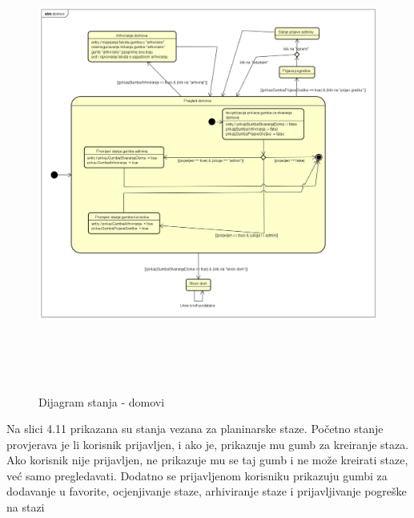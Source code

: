 			\begin{figure}[H]
				\includegraphics[width=160mm,height=150mm]{dijagrami/sd-autentikacija/domovi.png} %
				\centering
				\caption{Dijagram stanja - domovi}
				\label{fig:dijagrami_stanja2}
			\end{figure}
		
		    Na slici 4.11 prikazana su stanja vezana za planinarske staze. Početno stanje provjerava je li korisnik prijavljen, i ako je, prikazuje mu gumb za kreiranje staza. Ako korisnik nije prijavljen, ne prikazuje mu se taj gumb i ne može kreirati staze, već samo pregledavati. Dodatno se prijavljenom korisniku prikazuju gumbi za dodavanje u favorite, ocjenjivanje staze, arhiviranje staze i prijavljivanje pogreške na stazi
		    
